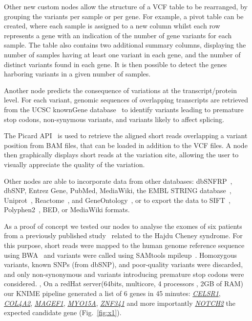 \documentclass{bioinfo}
\begin{document}
Other new custom nodes allow the structure of a VCF table to be rearranged, by grouping the variants per sample or per gene. For example, a pivot table can be created, where each sample is assigned to a new column whilst each row represents a gene with an indication of the number of gene variants for each sample. The table also contains two additional summary columns, displaying the number of samples having at least one variant in each gene, and the number of distinct variants found in each gene. It is then possible to detect the genes harboring variants in a given number of samples.

Another node predicts the consequence of variations at the transcript/protein level. For each variant, genomic sequences of overlapping transcripts are retrieved from the UCSC knownGene database~\citep{pmid16500937} to identify variants leading to premature stop codons, non-synymous variants, and variants likely to affect splicing.

The Picard API~\citep{pmid19505943} is used to retrieve the aligned short reads overlapping a variant position from BAM files, that can be loaded in addition to the VCF files. A node then graphically displays short reads at the variation site, allowing the user to visually appreciate the quality of the variation.

Other nodes are able to incorporate data from other databases: dbSNFRP~\citep{pmid21520341}, dbSNP, Entrez Gene, PubMed, MediaWiki, the EMBL STRING database~\citep{pmid17098935}, Uniprot~\citep{pmid21447597}, Reactome~\citep{pmid21067998}, and GeneOntology~\citep{pmid18957448}, or to export the data to SIFT~\citep{pmid11337480}, Polyphen2~\citep{pmid20354512}, BED, or MediaWiki formats.

As a proof of concept we tested our nodes to analyse the exomes of six patients from a previously published study~\citep{pmid21378989} related to the Hajdu Cheney syndrome. For this purpose, short reads were mapped to the human genome reference sequence using BWA~\citep{pmid20080505} and variants were called using SAMtools mpileup~\citep{pmid19505943}. Homozygous variants, known SNPs (from dbSNP), and poor-quality variants were discarded, and only non-synonymous and variants introducing premature stop codons were considered. , On a redHat server(64bits, multicore, 4 processors , 2GB of RAM) our KNIME pipeline generated a list of 6 genes in 45 minutes: \href{http://www.ncbi.nlm.nih.gov/gene/9620}{\textit{CELSR1}},  \href{http://www.ncbi.nlm.nih.gov/gene/1284}{\textit{COL4A2}}, \href{http://www.ncbi.nlm.nih.gov/gene/64110}{\textit{MAGEF1}}, \href{http://www.ncbi.nlm.nih.gov/gene/51168}{\textit{MYO15A}}, \href{http://www.ncbi.nlm.nih.gov/gene/84905}{\textit{ZNF341}} and more importantly \href{http://www.ncbi.nlm.nih.gov/gene/4853}{\textit{NOTCH2}} the expected candidate gene (Fig.~\ref{fig:x1}).
\end{document}
